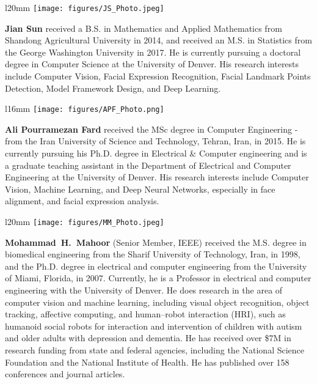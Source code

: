 \documentclass[sn-mathphys,iicol,Numbered]{sn-jnl}
\begin{document}


\begin{wrapfigure}{l}{20mm} 
\texttt{[image: figures/JS\_Photo.jpeg]}
\end{wrapfigure}\par
\textbf{Jian Sun} received a B.S. in Mathematics and Applied Mathematics from Shandong Agricultural University in 2014, and received an M.S. in Statistics from the George Washington University in 2017. He is currently pursuing a doctoral degree in Computer Science at the University of Denver. His research interests include Computer Vision, Facial Expression Recognition, Facial Landmark Points Detection, Model Framework Design, and Deep Learning.

\begin{wrapfigure}{l}{16mm} 
\texttt{[image: figures/APF\_Photo.png]}
\end{wrapfigure}\par
\textbf{Ali Pourramezan Fard} received the MSc degree in Computer Engineering - from the Iran University of Science and Technology, Tehran, Iran, in 2015. He is currently pursuing his Ph.D. degree in Electrical \& Computer engineering and is a graduate teaching assistant in the Department of Electrical and Computer Engineering at the University of Denver. His research interests include Computer Vision, Machine Learning, and Deep Neural Networks, especially in face alignment, and facial expression analysis.

\begin{wrapfigure}{l}{20mm} 
\texttt{[image: figures/MM\_Photo.jpeg]}
\end{wrapfigure}\par
\textbf{Mohammad~H.~Mahoor} (Senior Member, IEEE) received the M.S. degree in biomedical engineering from the Sharif University of Technology, Iran, in 1998, and the Ph.D. degree in electrical and computer engineering from the University of Miami, Florida, in 2007. Currently, he is a Professor in electrical and computer engineering with the University of Denver. He does research in the area of computer vision and machine learning, including visual object recognition, object tracking, affective computing, and human–robot interaction (HRI), such as humanoid social robots for interaction and intervention of children with autism and older adults with depression and dementia. He has received over \$7M in research funding from state and federal agencies, including the National Science Foundation and the National Institute of Health. He has published over 158 conferences and journal articles.
\end{document}
